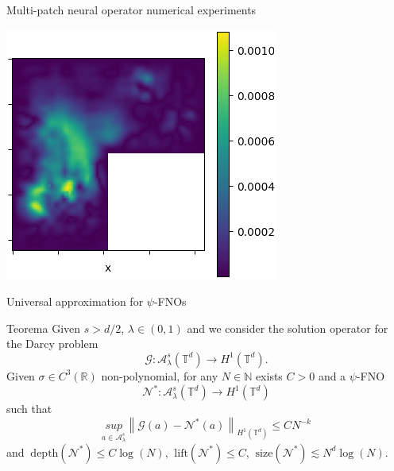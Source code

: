 \documentclass{beamer}
\newcommand{\numberset}{\mathbb}
\newcommand{\N}{\numberset{N}}
\newcommand{\R}{\numberset{R}}
\begin{document}
\begin{frame}{Multi-patch neural operator numerical experiments}
\begin{center}
\begin{minipage}{0.24\textwidth}
        \end{minipage}
        \hfill
        \begin{minipage}{0.24\textwidth}
            \includegraphics[width=\textwidth]{MPNO_error.png}
        \end{minipage}
    \end{center}
\end{frame}



\backmatter %


\appendix
\begin{frame}[noframenumbering]{Universal approximation for $\psi$-FNOs}
	\begin{themedTitleBlock}{Teorema} %
		Given $ s > d/2 $, $ \lambda \in (0,1) $ and we consider the solution operator for the Darcy problem 
		\[ \mathcal{G}: \mathcal{A}_{\lambda}^{s}(\mathbb{T}^d) \to H^1(\mathbb{T}^d). \]
		Given $ \sigma \in C^3(\R) $ non-polynomial, for any $ N \in \N $ exists $ C > 0 $ and a $ \psi $-FNO
		\[ \mathcal{N}^{*}: \mathcal{A}_{\lambda}^{s}(\mathbb{T}^d) \to H^1(\mathbb{T}^d)  \]
		such that	
		\[ \underset{a \in \mathcal{A}_{\lambda}^{s}}{sup} \left\| \mathcal{G}(a) - \mathcal{N}^{*}(a) \right\|_{H^1(\mathbb{T}^d)} \le CN^{-k} \]
		and $\ \mathrm{depth}(\mathcal{N}^{*}) \le C \log(N) $, $\  \mathrm{lift}(\mathcal{N}^{*}) \le C $, $\ \mathrm{size}(\mathcal{N}^{*}) \lesssim N^d\log(N). $
	\end{themedTitleBlock}
\end{frame}
\end{document}
